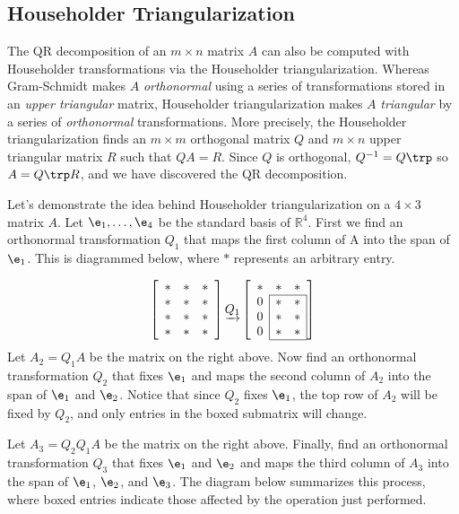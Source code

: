 \subsection*{Householder Triangularization} %

The QR decomposition of an $m \times n$ matrix $A$ can also be computed with Householder transformations via the Householder triangularization.
Whereas Gram-Schmidt makes $A$ \emph{orthonormal} using a series of transformations stored in an \emph{upper triangular} matrix, Householder triangularization makes $A$ \emph{triangular} by a series of \emph{orthonormal} transformations.
More precisely, the Householder triangularization finds an $m \times m$ orthogonal matrix $Q$ and $m \times n$ upper triangular matrix $R$ such that $QA = R$.
Since $Q$ is orthogonal, $Q^{-1}=Q\trp$ so $A = Q\trp R$, and we have discovered the QR decomposition.

Let's demonstrate the idea behind Householder triangularization on a $4 \times 3$ matrix $A$.
Let $\e_1, \ldots, \e_4$ be the standard basis of $\mathbb{R}^4$.
First we find an orthonormal transformation $Q_1$ that maps the first column of A into the span of $\e_1$.
This is diagrammed below, where $*$ represents an arbitrary entry.

\begin{equation*}
\left[\begin{array}{ccc}
* & * & * \\
* & * & * \\
* & * & * \\
* & * & *
\end{array}\right]
\underrightarrow{Q_1}
\left[\begin{array}{ccc}
    *  & * &     *  \\
\cline{2-3}
\rvl{0} & * & \rvl{*} \\
\rvl{0} & * & \rvl{*} \\
\rvl{0} & * & \rvl{*} \\
\cline{2-3}
\end{array}\right]
\end{equation*}
Let $A_2 = Q_1A$ be the matrix on the right above.
Now find an orthonormal transformation $Q_2$ that fixes $\e_1$ and maps the second column of $A_2$ into the span of $\e_1$ and $\e_2$.
Notice that since $Q_2$ fixes $\e_1$, the top row of $A_2$ will be fixed by $Q_2$, and only entries in the boxed submatrix will change.

Let $A_3 = Q_2Q_1A$ be the matrix on the right above.
Finally, find an orthonormal transformation $Q_3$ that fixes $\e_1$ and $\e_2$ and maps the third column of $A_3$ into the span of $\e_1$, $\e_2$, and $\e_3$.
The diagram below summarizes this process, where boxed entries indicate those affected by the operation just performed.

